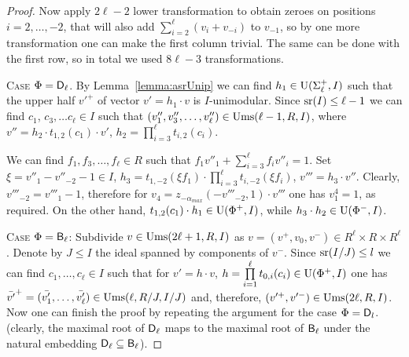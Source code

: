 \begin{proof}
Now apply $2\ell-2$ lower transformation to obtain zeroes on positions $i=2,\ldots,-2$, that will also add $\sum_{i=2}^\ell (v_i+v_{-i})$ to $v_{-1}$,
so by one more transformation one can make the first column trivial. 
The same can be done with the first row, so in total we used $8\ell-3$ transformations.

\textsc{Case $\Phi=\mathsf{D}_\ell$.} 
By Lemma~\ref{lemma:asrUnip} we can find $h_1\in \operatorname{U}(\Sigma^+_\ell, I)$ such that the upper half $v'^+$ of vector $v'=h_1\cdot v$ is $I$-unimodular.
Since $\operatorname{sr}(I)\leq \ell-1$ we can find $c_1$, $c_3, \ldots c_\ell \in I$ such that $(v''_1, v''_3, \ldots, v''_\ell) \in \operatorname{Ums}(\ell-1, R, I)$, where
$v''=h_2 \cdot t_{1,2}(c_1) \cdot v'$, $h_2=\prod\limits_{i=3}^\ell t_{i,2}(c_i)$.

We can find $f_1, f_3,\ldots, f_\ell \in R$ such that $f_1v''_1+\sum\limits_{i=3}^\ell f_i v''_{i} = 1$.
Set $\xi = v''_1-v''_{-2}-1 \in I$, $h_3 = t_{1,-2}(\xi f_1) \cdot \prod\limits_{i=3}^\ell t_{i,-2}(\xi f_i)$, $v'''=h_3 \cdot v''$.
Clearly, $v'''_{-2}=v'''_1-1$, therefore for $v_4 = z_{-\alpha_{max}}(-v'''_{-2}, 1) \cdot v'''$ one has $v^4_1 = 1$, as required.
On the other hand, $t_{1,2}(c_1) \cdot h_1 \in \operatorname{U}(\Phi^+, I)$, while $ h_3 \cdot h_2 \in \operatorname{U}(\Phi^-, I)$.

\textsc{Case $\Phi=\mathsf{B}_\ell$:} Subdivide $v\in \operatorname{Ums}(2\ell+1, R, I)$ as $v=(v^+, v_0, v^-)\in R^\ell\times R\times R^\ell$.
Denote by $J\leq I$ the ideal spanned by components of $v^-$.
Since $\operatorname{sr}(I/J)\leq l$ we can find $c_1,\dots,c_\ell\in I$ such that for $v' = h \cdot v$, $h = \prod\limits_{i=1}^\ell t_{0, i}(c_i) \in \operatorname{U}(\Phi^+, I)$
one has $\bar{v'}^+=(\bar{v'_1},\ldots, \bar{v'_\ell}) \in \operatorname{Ums}(\ell, R/J, I/J)$ and, therefore, $(v'^+, v'^-) \in \operatorname{Ums}(2\ell, R, I)$.
Now one can finish the proof by repeating the argument for the case $\Phi=\mathsf{D}_l$.
(clearly, the maximal root of $\mathsf{D}_\ell$ maps to the maximal root of $\mathsf{B}_\ell$ under the natural embedding $\mathsf{D}_\ell\subseteq\mathsf{B}_\ell$). \end{proof}